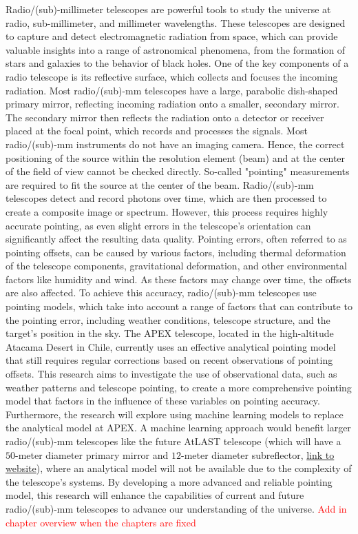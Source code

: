 Radio/(sub)-millimeter telescopes are powerful tools to study the universe at radio, sub-millimeter, and millimeter wavelengths.
These telescopes are designed to capture and detect electromagnetic radiation from space, which can provide valuable insights into a range of astronomical phenomena,
from the formation of stars and galaxies to the behavior of black holes.
One of the key components of a radio telescope is its reflective surface, which collects and focuses the incoming radiation.
Most radio/(sub)-mm telescopes have a large, parabolic dish-shaped primary mirror, reflecting incoming radiation onto a smaller, secondary mirror.
The secondary mirror then reflects the radiation onto a detector or receiver placed at the focal point, which records and processes the signals.
Most radio/(sub)-mm instruments do not have an imaging camera.
Hence, the correct positioning of the source within the resolution element (beam) and at the center of the field of view cannot be checked directly.
So-called "pointing" measurements are required to fit the source at the center of the beam.
Radio/(sub)-mm telescopes detect and record photons over time, which are then processed to create a composite image or spectrum.
However, this process requires highly accurate pointing, as even slight errors in the telescope's orientation can significantly affect the resulting data quality.
Pointing errors, often referred to as pointing offsets, can be caused by various factors, including thermal deformation of the telescope components,
gravitational deformation, and other environmental factors like humidity and wind. As these factors may change over time, the offsets are also affected.
To achieve this accuracy, radio/(sub)-mm telescopes use pointing models, which take into account a range of factors that can contribute to the pointing error,
including weather conditions, telescope structure, and the target's position in the sky.
The APEX telescope, located in the high-altitude Atacama Desert in Chile,
currently uses an effective analytical pointing model that still requires regular corrections based on recent observations of pointing offsets.
This research aims to investigate the use of observational data, such as weather patterns and telescope pointing,
to create a more comprehensive pointing model that factors in the influence of these variables on pointing accuracy.
Furthermore, the research will explore using machine learning models to replace the analytical model at APEX.
A machine learning approach would benefit larger radio/(sub)-mm telescopes like the future AtLAST telescope
(which will have a $50$-meter diameter primary mirror and $12$-meter diameter subreflector, \hyperlink{https://www.atlast.uio.no}{link to website}),
where an analytical model will not be available due to the complexity of the telescope's systems.
By developing a more advanced and reliable pointing model, this research will enhance the capabilities of current and future radio/(sub)-mm telescopes to advance our understanding of the universe.
\textcolor{red}{Add in chapter overview when the chapters are fixed}
